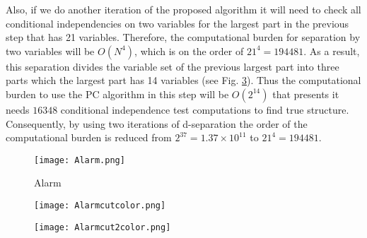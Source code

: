 \documentclass{article}
\begin{document}
Also, if we do another iteration of the proposed algorithm it will need to check all conditional independencies on two variables for the largest part in the previous step that has 21 variables. Therefore, the computational burden for separation by two variables will be $O(N^4)$, which is on the order of $21^4=194481$.
As a result, this separation divides the variable set of the previous largest part into three parts which the largest part has 14 variables (see Fig. \ref{Alarm2}). Thus the computational burden to use the PC algorithm in this step will be $O(2^14)$ that presents it needs $16348$ conditional independence test computations to find true structure.
Consequently, by using two iterations of d-separation the order of the computational burden is reduced from $2^{37}=1.37\times 10^{11}$ to $21^{4}=194481$.

\begin{figure}
    \centering
    \texttt{[image: Alarm.png]}
    \caption{Alarm}
    \label{Alarm}
\end{figure}

\begin{figure}
    \centering
    \texttt{[image: Alarmcutcolor.png]}
    \label{Alarm1}
\end{figure}

\begin{figure}
    \centering
    \texttt{[image: Alarmcut2color.png]}
    \label{Alarm2}
\end{figure}
\end{document}
